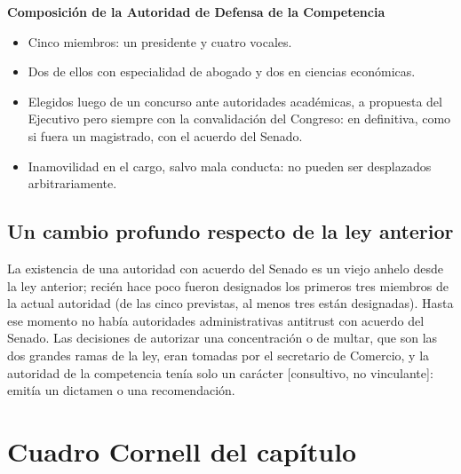\documentclass[12pt,oneside]{book}
\begin{document}
\begin{important}
\textbf{Composición de la Autoridad de Defensa de la Competencia}
\begin{itemize}
    \item Cinco miembros: un presidente y cuatro vocales.
    \item Dos de ellos con especialidad de abogado y dos en ciencias económicas.
    \item Elegidos luego de un concurso ante autoridades académicas, a propuesta del Ejecutivo pero siempre con la convalidación del Congreso: en definitiva, como si fuera un magistrado, con el acuerdo del Senado.
    \item Inamovilidad en el cargo, salvo mala conducta: no pueden ser desplazados arbitrariamente.
\end{itemize}
\end{important}

\subsection{Un cambio profundo respecto de la ley anterior}

La existencia de una autoridad con acuerdo del Senado es un viejo anhelo desde la ley anterior; recién hace poco fueron designados los primeros tres miembros de la actual autoridad (de las cinco previstas, al menos tres están designadas). Hasta ese momento no había autoridades administrativas antitrust con acuerdo del Senado. Las decisiones de autorizar una concentración o de multar, que son las dos grandes ramas de la ley, eran tomadas por el secretario de Comercio, y la autoridad de la competencia tenía solo un carácter [consultivo, no vinculante]: emitía un dictamen o una recomendación.


\section{Cuadro Cornell del capítulo}
\end{document}
